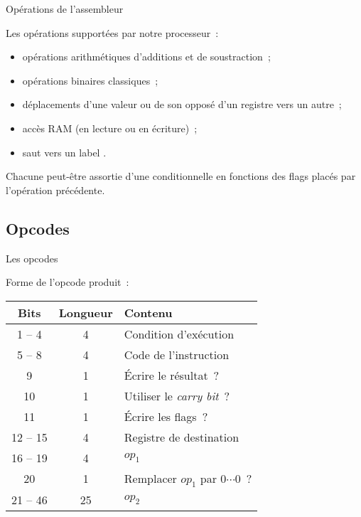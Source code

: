 \documentclass[11pt]{beamer}
\begin{document}
\begin{frame}{Opérations de l'assembleur}

Les opérations supportées par notre processeur~:

\begin{itemize}
\item opérations arithmétiques d'additions et de soustraction~;

\item opérations binaires classiques~;

\item déplacements d'une valeur ou de son opposé d'un registre vers un autre~;

\item accès RAM (en lecture ou en  écriture)~;

\item saut vers un label .
\end{itemize}

Chacune peut-être assortie d'une conditionnelle en fonctions des flags placés par l'opération précédente.

\end{frame}

\subsection{Opcodes}

\begin{frame}{Les opcodes}

Forme de l'opcode produit~:

\begin{tabular}{|c|c|l|}
\hline
\textbf{Bits} & \textbf{Longueur} & \textbf{Contenu}\\
\hline
1 -- 4 & 4 & Condition d'exécution \\
5 -- 8 & 4 & Code de l'instruction \\
9 & 1 & Écrire le résultat~? \\
10 & 1 & Utiliser le \textit{carry bit}~?  \\
11 & 1 & Écrire les flags~? \\
12 -- 15 & 4 & Registre de destination \\
16 -- 19 & 4 & $op_1$ \\
20 & 1 & Remplacer $op_1$ par $0\cdots 0$~? \\
21 -- 46 & 25 & $op_2$ \\ \hline
\end{tabular}

\end{frame}
\end{document}
